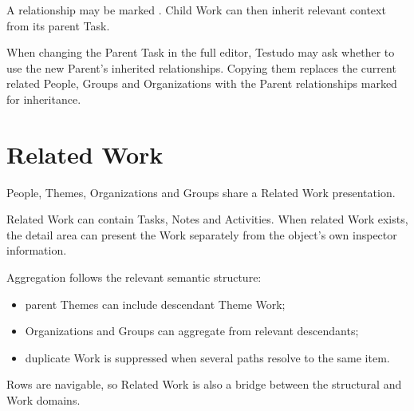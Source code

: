 \documentclass{testudomanual}
\begin{document}
A relationship may be marked . Child Work can then inherit relevant context from its parent Task.

When changing the Parent Task in the full editor, Testudo may ask whether to use the new Parent's inherited relationships. Copying them replaces the current related People, Groups and Organizations with the Parent relationships marked for inheritance.


\chapter{Related Work}

People, Themes, Organizations and Groups share a Related Work presentation.

Related Work can contain Tasks, Notes and Activities. When related Work exists, the detail area can present the Work separately from the object's own inspector information.

Aggregation follows the relevant semantic structure:
\begin{itemize}
    \item parent Themes can include descendant Theme Work;
    \item Organizations and Groups can aggregate from relevant descendants;
    \item duplicate Work is suppressed when several paths resolve to the same item.
\end{itemize}

Rows are navigable, so Related Work is also a bridge between the structural and Work domains.


\end{document}
